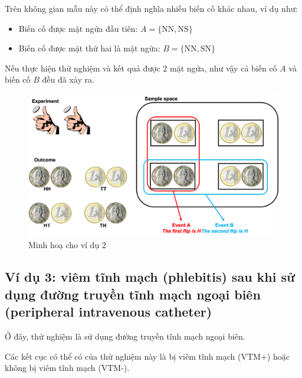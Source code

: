 \documentclass[
]{book}
\providecommand{\tightlist}{%
  \setlength{\itemsep}{0pt}\setlength{\parskip}{0pt}}
\begin{document}
Trên không gian mẫu này có thể định nghĩa nhiều biến cố khác nhau, ví dụ như:

\begin{itemize}
\tightlist
\item
  Biến cố được mặt ngửa đầu tiên: \(A = \{\text{NN},\text{NS}\}\)
\item
  Biến cố được mặt thứ hai là mặt ngửa: \(B = \{\text{NN},\text{SN}\}\)
\end{itemize}

Nếu thực hiện thử nghiệm và kết quả được 2 mặt ngửa, như vậy cả biến cố \(A\) và biến cố \(B\) đều đã xảy ra.

\begin{figure}
\includegraphics[width=25.39in]{figures/Picture02} \caption{Minh hoạ cho ví dụ 2}\label{fig:example2}
\end{figure}

\hypertarget{vuxed-dux1ee5-3-viuxeam-tux129nh-mux1ea1ch-phlebitis-sau-khi-sux1eed-dux1ee5ng-ux111ux1b0ux1eddng-truyux1ec1n-tux129nh-mux1ea1ch-ngoux1ea1i-biuxean-peripheral-intravenous-catheter}{%
\subsection{Ví dụ 3: viêm tĩnh mạch (phlebitis) sau khi sử dụng đường truyền tĩnh mạch ngoại biên (peripheral intravenous catheter)}\label{vuxed-dux1ee5-3-viuxeam-tux129nh-mux1ea1ch-phlebitis-sau-khi-sux1eed-dux1ee5ng-ux111ux1b0ux1eddng-truyux1ec1n-tux129nh-mux1ea1ch-ngoux1ea1i-biuxean-peripheral-intravenous-catheter}}

Ở đây, thử nghiệm là sử dụng đường truyền tĩnh mạch ngoại biên.

Các kết cục có thể có của thử nghiệm này là bị viêm tĩnh mạch (\(\text{VTM+}\)) hoặc không bị viêm tĩnh mạch (\(\text{VTM-}\)).
\end{document}
